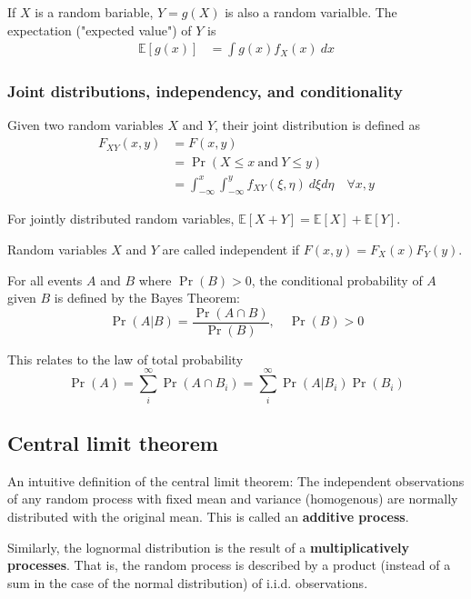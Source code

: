 \documentclass[letterpaper, 12pt]{article}
\newcommand{\E}{\mathbb{E}} %
\newcommand{\1}{\mathds{1}} %
\theoremstyle{definition}
\begin{document}
If $X$ is a random bariable, $Y = g(X)$  is also a random varialble. The expectation ("expected value") of $Y$ is
\begin{align*}
  \E[g(x)] & = \int g(x)f_X(x)~dx
\end{align*}

\subsubsection{Joint distributions, independency, and conditionality}

Given two random variables $X$ and $Y$, their joint distribution is defined as
\begin{align*}
  F_{XY}(x, y)
    & = F(x, y)                                                                           \\
    & = \Pr(X \leq x ~\text{and}~ Y \leq y)                                               \\
    & = \int_{-\infty}^x \int_{-\infty}^yf_{XY}(\xi, \eta)~ d\xi d\eta \quad \forall x, y
\end{align*}

For jointly distributed random variables, $\E[X + Y] = \E[X] + \E[Y]$.

Random variables $X$ and $Y$ are called independent if $F(x,y) = F_X(x)F_Y(y)$.

For all events $A$ and $B$ where $\Pr(B) > 0$, the conditional probability of $A$ given $B$ is defined by the Bayes Theorem:
\[
  \Pr(A | B) = \frac{\Pr(A \cap B)}{\Pr(B)}, \quad \Pr(B) > 0
\]

This relates to the law of total probability
\[
  \Pr(A) = \sum_i^\infty\Pr(A \cap B_i) =  \sum_i^\infty\Pr(A | B_i) \Pr(B_i)
\]

\subsection{Central limit theorem}

An intuitive definition of the central limit theorem: The independent observations of any random process with fixed mean and variance (homogenous) are normally distributed with the original mean. This is called an \textbf{additive process}.

Similarly, the lognormal distribution is the result of a \textbf{multiplicatively processes}. That is, the random process is described by a product (instead of a sum in the case of the normal distribution) of i.i.d. observations.
\end{document}
